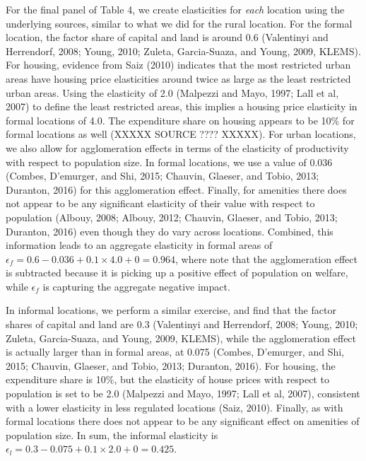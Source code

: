 \documentclass[10pt]{article}
\begin{document}
For the final panel of Table 4, we create elasticities for \textit{each} location using the underlying sources, similar to what we did for the rural location. For the formal location, the factor share of capital and land is around 0.6 (Valentinyi and Herrendorf, 2008; Young, 2010; Zuleta, Garcia-Suaza, and Young, 2009, KLEMS). For housing, evidence from Saiz (2010) indicates that the most restricted urban areas have housing price elasticities around twice as large as the least restricted urban areas. Using the elasticity of 2.0 (Malpezzi and Mayo, 1997; Lall et al, 2007) to define the least restricted areas, this implies a housing price elasticity in formal locations of 4.0. The expenditure share on housing appears to be 10\% for formal locations as well (XXXXX SOURCE ???? XXXXX). For urban locations, we also allow for agglomeration effects in terms of the elasticity of productivity with respect to population size. In formal locations, we use a value of 0.036 (Combes, D'emurger, and Shi, 2015; Chauvin, Glaeser, and Tobio, 2013; Duranton, 2016) for this agglomeration effect. Finally, for amenities there does not appear to be any significant elasticity of their value with respect to population (Albouy, 2008; Albouy, 2012; Chauvin, Glaeser, and Tobio, 2013; Duranton, 2016) even though they do vary across locations. Combined, this information leads to an aggregate elasticity in formal areas of $\epsilon_f = 0.6 - 0.036 + 0.1 \times 4.0 + 0 = 0.964$, where note that the agglomeration effect is subtracted because it is picking up a positive effect of population on welfare, while $\epsilon_f$ is capturing the aggregate negative impact. 

In informal locations, we perform a similar exercise, and find that the factor shares of capital and land are 0.3 (Valentinyi and Herrendorf, 2008; Young, 2010; Zuleta, Garcia-Suaza, and Young, 2009, KLEMS), while the agglomeration effect is actually larger than in formal areas, at 0.075 (Combes, D'emurger, and Shi, 2015; Chauvin, Glaeser, and Tobio, 2013; Duranton, 2016). For housing, the expenditure share is 10\%, but the elasticity of house prices with respect to population is set to be 2.0 (Malpezzi and Mayo, 1997; Lall et al, 2007), consistent with a lower elasticity in less regulated locations (Saiz, 2010). Finally, as with formal locations there does not appear to be any significant effect on amenities of population size. In sum, the informal elasticity is $\epsilon_l = 0.3 - 0.075 + 0.1 \times 2.0 + 0 = 0.425$.
\end{document}
